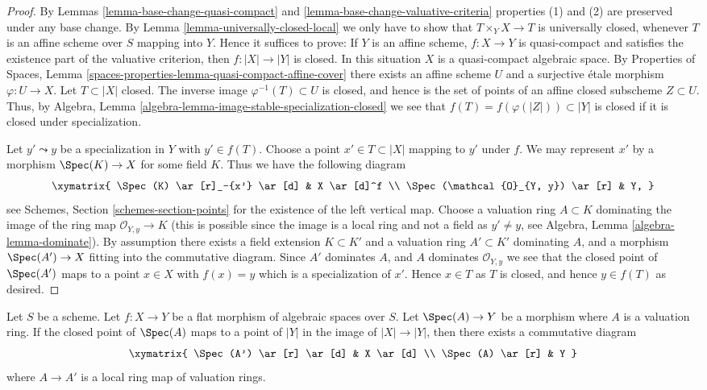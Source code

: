 \begin{proof}
By Lemmas \ref{lemma-base-change-quasi-compact}
and \ref{lemma-base-change-valuative-criteria}
properties (1) and (2) are preserved under
any base change. By Lemma \ref{lemma-universally-closed-local}
we only have to show that $T \times_Y X \to T$ is universally closed,
whenever $T$ is an affine scheme over $S$ mapping into $Y$. Hence it
suffices to prove: If $Y$ is an affine scheme, $f : X \to Y$ is quasi-compact
and satisfies the existence part of the valuative criterion, then
$f : |X| \to |Y|$ is closed. In this situation $X$ is a quasi-compact
algebraic space. By
Properties of Spaces,
Lemma \ref{spaces-properties-lemma-quasi-compact-affine-cover}
there exists an affine scheme $U$ and a surjective \'etale morphism
$\varphi : U \to X$. Let $T \subset |X|$ closed. The inverse image
$\varphi^{-1}(T) \subset U$ is closed, and hence is the set of points
of an affine closed subscheme $Z \subset U$. Thus, by
Algebra, Lemma \ref{algebra-lemma-image-stable-specialization-closed}
we see that $f(T) = f(\varphi(|Z|)) \subset |Y|$ is closed if it is
closed under specialization.

\medskip\noindent
Let $y' \leadsto y$ be a specialization in $Y$ with $y' \in f(T)$.
Choose a point $x' \in T \subset |X|$ mapping to $y'$ under $f$.
We may represent $x'$ by a morphism $\Spec(K) \to X$
for some field $K$. Thus we have the following diagram
$$
\xymatrix{
\Spec(K) \ar[r]_-{x'} \ar[d] & X \ar[d]^f \\
\Spec(\mathcal{O}_{Y, y}) \ar[r] & Y,
}
$$
see
Schemes, Section \ref{schemes-section-points}
for the existence of the left vertical map.
Choose a valuation ring $A \subset K$ dominating the image of
the ring map $\mathcal{O}_{Y, y} \to K$ (this is possible since
the image is a local ring and not a field as $y' \not = y$, see
Algebra, Lemma \ref{algebra-lemma-dominate}).
By assumption there exists a field extension $K \subset K'$ and a
valuation ring $A' \subset K'$ dominating $A$, and a morphism
$\Spec(A') \to X$ fitting into the commutative diagram.
Since $A'$ dominates $A$, and $A$ dominates $\mathcal{O}_{Y, y}$
we see that the closed point of $\Spec(A')$ maps to
a point $x \in X$ with $f(x) = y$ which is a specialization of $x'$.
Hence $x \in T$ as $T$ is closed, and hence $y \in f(T)$ as desired.
\end{proof}

\begin{lemma}
\label{lemma-lift-valuation-ring-through-flat-morphism}
Let $S$ be a scheme. Let $f : X \to Y$ be a flat morphism
of algebraic spaces over $S$.
Let $\Spec(A) \to Y$ be a morphism where $A$ is a
valuation ring. If the closed point of $\Spec(A)$ maps to a
point of $|Y|$ in the image of $|X| \to |Y|$, then there exists
a commutative diagram
$$
\xymatrix{
\Spec(A') \ar[r] \ar[d] & X \ar[d] \\
\Spec(A) \ar[r] & Y
}
$$
where $A \to A'$ is a local ring map of valuation rings.
\end{lemma}

